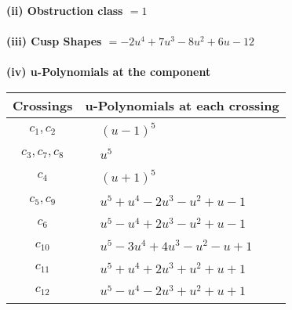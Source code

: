 \documentclass[1p]{elsarticle_modified}
\theoremstyle{definition}
\begin{document}
\flushleft \textbf{(ii) Obstruction class $= 1$}\\~\\
\flushleft \textbf{(iii) Cusp Shapes $= -2 u^4+7 u^3-8 u^2+6 u-12$}\\~\\
\newpage\renewcommand{\arraystretch}{1}
\flushleft \textbf{(iv) u-Polynomials at the component}\newline \\
\begin{tabular}{m{50pt}|m{274pt}}
Crossings & \hspace{64pt}u-Polynomials at each crossing \\
\hline $$\begin{aligned}c_{1},c_{2}\end{aligned}$$&$\begin{aligned}
&(u-1)^5
\end{aligned}$\\
\hline $$\begin{aligned}c_{3},c_{7},c_{8}\end{aligned}$$&$\begin{aligned}
&u^5
\end{aligned}$\\
\hline $$\begin{aligned}c_{4}\end{aligned}$$&$\begin{aligned}
&(u+1)^5
\end{aligned}$\\
\hline $$\begin{aligned}c_{5},c_{9}\end{aligned}$$&$\begin{aligned}
&u^5+u^4-2 u^3- u^2+u-1
\end{aligned}$\\
\hline $$\begin{aligned}c_{6}\end{aligned}$$&$\begin{aligned}
&u^5- u^4+2 u^3- u^2+u-1
\end{aligned}$\\
\hline $$\begin{aligned}c_{10}\end{aligned}$$&$\begin{aligned}
&u^5-3 u^4+4 u^3- u^2- u+1
\end{aligned}$\\
\hline $$\begin{aligned}c_{11}\end{aligned}$$&$\begin{aligned}
&u^5+u^4+2 u^3+u^2+u+1
\end{aligned}$\\
\hline $$\begin{aligned}c_{12}\end{aligned}$$&$\begin{aligned}
&u^5- u^4-2 u^3+u^2+u+1
\end{aligned}$\\
\hline
\end{tabular}\\~\\
\end{document}
